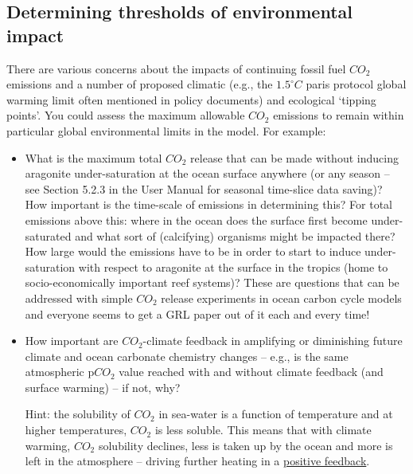 
\subsection{Determining thresholds of environmental impact}

There are various concerns about the impacts of continuing fossil fuel \(CO_{2}\) emissions and a number of proposed climatic (e.g., the \(1.5^{\circ} C \) paris protocol global warming limit often mentioned in policy documents) and ecological ‘tipping points’. You could assess the maximum allowable \(CO_{2}\) emissions to remain within particular global environmental limits in the model. For example:

\begin{itemize}[noitemsep]

\vspace{1mm}
\item What is the maximum total \(CO_{2}\) release that can be made without inducing aragonite under-saturation at the ocean surface anywhere (or any season – see Section 5.2.3 in the User Manual for seasonal time-slice data saving)? How important is the time-scale of emissions in determining this? For total emissions above this: where in the ocean does the surface first become under-saturated and what sort of (calcifying) organisms might be impacted there? How large would the emissions have to be in order to start to induce under-saturation with respect to aragonite at the surface in the tropics (home to socio-economically important reef systems)? These are questions that can be addressed with simple \(CO_{2}\) release experiments in ocean carbon cycle models and everyone seems to get a GRL paper out of it each and every time!

\vspace{1mm}
\item How important are \(CO_{2}\)-climate feedback in amplifying or diminishing future climate and ocean carbonate chemistry changes – e.g., is the same atmospheric p\(CO_{2}\) value reached with and without climate feedback (and surface warming) – if not, why? 

Hint: the solubility of \(CO_{2}\) in sea-water is a function of temperature and at higher temperatures, \(CO_{2}\) is less soluble. This means that with climate warming, \(CO_{2}\) solubility declines, less is taken up by the ocean and more is left in the atmosphere -- driving further heating in a \uline{positive feedback}.


\end{itemize}
